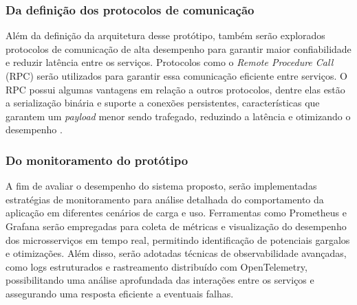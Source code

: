 \subsubsection{Da definição dos protocolos de comunicação}
Além da definição da arquitetura desse protótipo, também serão explorados protocolos de comunicação de alta desempenho para garantir maior confiabilidade e reduzir latência entre os serviços. Protocolos como o \textit{Remote Procedure Call} (RPC) serão utilizados para garantir essa comunicação eficiente entre serviços. O RPC possui algumas vantagens em relação a outros protocolos, dentre elas estão a serialização binária e suporte a conexões persistentes, características que garantem um \textit{payload} menor sendo trafegado, reduzindo a latência e otimizando o desempenho \cite{Niswar2024}. 

\subsubsection{Do monitoramento do protótipo}
A fim de avaliar o desempenho do sistema proposto, serão implementadas estratégias de monitoramento para análise detalhada do comportamento da aplicação em diferentes cenários de carga e uso. Ferramentas como Prometheus e Grafana serão empregadas para coleta de métricas e visualização do desempenho dos microsserviços em tempo real, permitindo identificação de potenciais gargalos e otimizações. Além disso, serão adotadas técnicas de observabilidade avançadas, como logs estruturados e rastreamento distribuído com OpenTelemetry, possibilitando uma análise aprofundada das interações entre os serviços e assegurando uma resposta eficiente a eventuais falhas.


